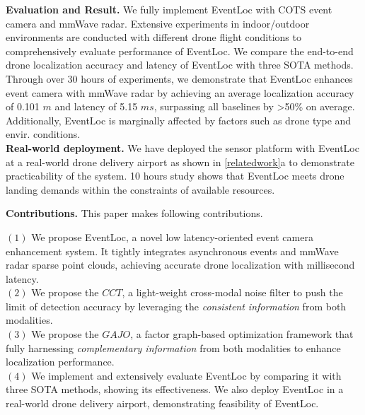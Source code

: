 \noindent \textbf{Evaluation and Result.} 
We fully implement EventLoc with COTS event camera and mmWave radar.
Extensive experiments in indoor/outdoor environments are conducted with different drone flight conditions to comprehensively evaluate performance of EventLoc.
We compare the end-to-end drone localization accuracy and latency of EventLoc with three SOTA methods.
Through over 30 hours of experiments, we demonstrate that EventLoc enhances event camera with mmWave radar by achieving an average localization accuracy of 0.101 $m$ and latency of 5.15 $ms$, surpassing all baselines by >50\% on average.
Additionally, EventLoc is marginally affected by factors such as drone type and envir. conditions.\\
\textbf{Real-world deployment.}
We have deployed the sensor platform with EventLoc at a real-world drone delivery airport as shown in \fig \ref{relatedwork}a to demonstrate practicability of the system.
10 hours study shows that EventLoc meets drone landing demands within the constraints of available resources.

\noindent \textbf{Contributions.} This paper makes following contributions.

\noindent $(1)$ We propose EventLoc, a novel low latency-oriented event camera enhancement system. It tightly integrates asynchronous events and mmWave radar sparse point clouds, achieving accurate drone localization with millisecond latency.\\
\noindent $(2)$ We propose the $CCT$, a light-weight cross-modal noise filter to push the limit of detection accuracy by leveraging the \textit{consistent information} from both modalities. \\
\noindent $(3)$  We propose the $GAJO$, a factor graph-based optimization framework that fully harnessing \textit{complementary information} from both modalities to enhance localization performance.\\
\noindent $(4)$ We implement and extensively evaluate EventLoc by comparing it with three SOTA methods, showing its effectiveness. We also deploy EventLoc in a real-world drone delivery airport, demonstrating feasibility of EventLoc.
